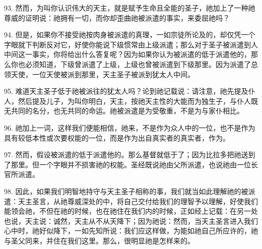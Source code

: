 93. 然而，为叫你认识伟大的天主，就是赋予生命且全能的圣子，祂加上了一种祂尊威的证明说：祂拥有一切，而你却歪曲祂被派遣的事实，来委屈祂吗？\par

94. 但是，如果你不接受祂按肉身被派遣的真理，一如宗徒所论及的，却仅凭一个字眼就下判断反对它，好使你能说下级惯常由上级派遣；那么对于圣子被派遣到人中间这一事实，你将给出什么答复呢？因为如果你认为被派遣的低于派遣他的，那么你也必须知道，下级曾派遣了上级，上级也曾被派遣到下级那里。因为派遣了总领天使，一位天使被派到那里，天主圣子被派到犹太人中间。\par

95. 难道天主圣子低于祂被派往的犹太人吗？论到祂记载说：请注意，祂先提及仆人，然后提及儿子，为叫你明白，天主，按祂天主性的大能而为独生子，与仆人既无共同的名分，也无共同的命运。祂被派遣是为受敬重，不是为与家仆相比。\par

96. 祂加上一词，这样我们便能相信，祂来，不是作为众人中的一位，也不是作为具有较低本性或次要权能的一位，而是作为出自真实者的真实者，作为。\par

97. 然而，假设被派遣的低于派遣他的。那么基督就低于了；因为比拉多把祂送到了那里。但一个字眼并不损害祂的权能。圣经既说祂由父所派遣，也说祂由一位长官所派遣。\par

98. 因此，如果我们明智地持守与天主圣子相称的事，我们就当如此理解祂的被派遣：天主圣言，从祂尊威深处的中，将自己交付给我们的理智予以理解，好使我们能领会祂，不但在祂的时候，也在祂住在我们内的时候，正如经上记载：在另一处也说，天主说：诚然，天主从不从天降下；因为祂说：然而，当天主圣言进入我们心中时，祂好似降下，一如先知所说：我们应这样做，为能如祂自己所应许的，祂与圣父同来，并住在我们这里。那么，很明显祂是怎样来的。\par


